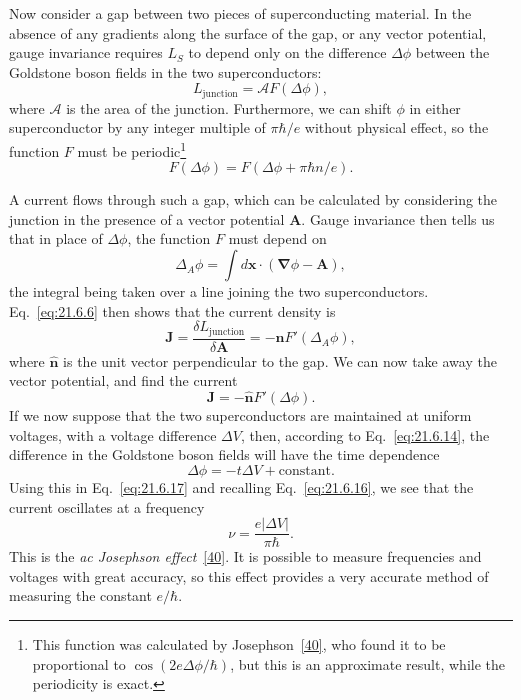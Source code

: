 Now consider a gap between two pieces of superconducting material. In the absence of any gradients along the surface of the gap, or any vector potential, gauge invariance requires $L_S$ to depend only on the difference $\Delta\phi$ between the Goldstone boson fields in the two superconductors:
\begin{equation}
L_{\mathrm{junction}}=\mathcal A F(\Delta\phi),
\tag{21.6.15}\label{eq:21.6.15}
\end{equation}
where $\mathcal A$ is the area of the junction. Furthermore, we can shift $\phi$ in either superconductor by any integer multiple of $\pi\hbar/e$ without physical effect, so the function $F$ must be periodic\footnote{This function was calculated by Josephson~\hyperref[ch21-ref-40]{[40]}, who found it to be proportional to $\cos(2e\Delta\phi/\hbar)$, but this is an approximate result, while the periodicity is exact.}
\begin{equation}
F(\Delta\phi)=F(\Delta\phi+\pi\hbar n/e).
\tag{21.6.16}\label{eq:21.6.16}
\end{equation}

A current flows through such a gap, which can be calculated by considering the junction in the presence of a vector potential $\mathbf A$. Gauge invariance then tells us that in place of $\Delta\phi$, the function $F$ must depend on
\[
\Delta_A\phi=\int d\mathbf x\cdot
\left(\boldsymbol\nabla\phi-\mathbf A\right),
\]
the integral being taken over a line joining the two superconductors. Eq.~\eqref{eq:21.6.6} then shows that the current density is
\[
\mathbf J=\frac{\delta L_{\mathrm{junction}}}{\delta\mathbf A}
=-\widehat{\mathbf n}F'(\Delta_A\phi),
\]
where $\widehat{\mathbf n}$ is the unit vector perpendicular to the gap. We can now take away the vector potential, and find the current
\begin{equation}
\mathbf J=-\widehat{\mathbf n}F'(\Delta\phi).
\tag{21.6.17}\label{eq:21.6.17}
\end{equation}
If we now suppose that the two superconductors are maintained at uniform voltages, with a voltage difference $\Delta V$, then, according to Eq.~\eqref{eq:21.6.14}, the difference in the Goldstone boson fields will have the time dependence
\begin{equation}
\Delta\phi=-t\Delta V+\text{constant}.
\tag{21.6.18}\label{eq:21.6.18}
\end{equation}
Using this in Eq.~\eqref{eq:21.6.17} and recalling Eq.~\eqref{eq:21.6.16}, we see that the current oscillates at a frequency
\begin{equation}
\nu=\frac{e|\Delta V|}{\pi\hbar}.
\tag{21.6.19}\label{eq:21.6.19}
\end{equation}
This is the \emph{ac Josephson effect}~\hyperref[ch21-ref-40]{[40]}. It is possible to measure frequencies and voltages with great accuracy, so this effect provides a very accurate method of measuring the constant $e/\hbar$.

